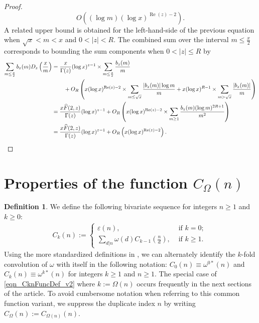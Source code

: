 \documentclass[11pt,reqno,a4letter]{article}
\numberwithin{equation}{section}
\numberwithin{figure}{section}
\numberwithin{table}{section}
\theoremstyle{plain}
\numberwithin{theorem}{section}
\theoremstyle{definition}
\newtheorem{definition}[theorem]{Definition}
\renewcommand{\Re}{\operatorname{Re}}
\begin{document}
\begin{proof}
\[     O\left((\log m) (\log x)^{\Re(z) - 2}\right). 
\]
A related upper bound is obtained for the left-hand-side of the previous equation when 
$\sqrt{x} < m < x$ and $0 < |z| < R$. 
The combined sum over the interval $m \leq \frac{x}{2}$ corresponds to bounding the 
sum components when $0 < |z| \leq R$ by 
\begin{align*} 
\sum_{m \leq \frac{x}{2}} b_z(m) D_z\left(\frac{x}{m}\right) & = \frac{x}{\Gamma(z)} (\log x)^{z-1} \times 
     \sum_{m \leq \frac{x}{2}} \frac{b_z(m)}{m} \\ 
     & \phantom{=\quad\ } + 
     O_R\left(x (\log x)^{\Re(z)-2} \times \sum_{m \leq \sqrt{x}} \frac{|b_z(m)| \log m}{m} + 
     x (\log x)^{R-1} \times \sum_{m > \sqrt{x}} \frac{|b_z(m)|}{m}\right) \\ 
     & = \frac{x \widehat{F}(2, z)}{\Gamma(z)} (\log x)^{z-1} + O_R\left( 
     x (\log x)^{\Re(z)-2} \times \sum_{m \geq 1} \frac{b_z(m) (\log m)^{2R+1}}{m^2} 
     \right) \\ 
     & = \frac{x \widehat{F}(2, z)}{\Gamma(z)} (\log x)^{z-1} + O_{R}\left( 
     x (\log x)^{\Re(z)-2}\right). 
     \qedhere  
\end{align*} 
\end{proof} 

\section{Properties of the function $C_{\Omega}(n)$} 
\label{Section_NewFormulasForgInvn_v1} 

\begin{definition}
We define the following bivariate sequence for integers $n \geq 1$ and $k \geq 0$: 
\begin{align} 
\label{eqn_CknFuncDef_v2} 
C_k(n) := \begin{cases} 
     \varepsilon(n), & \text{ if $k = 0$; } \\ 
     \sum\limits_{d|n} \omega(d) C_{k-1}\left(\frac{n}{d}\right), & \text{ if $k \geq 1$. } 
     \end{cases} 
\end{align} 
Using the more standardized definitions in \cite[\S 2]{ANT-BATEMAN-DIAMOND}, we can alternately 
identify the $k$-fold convolution of $\omega$ with itself in the following notation: 
$C_0(n) \equiv \omega^{0\ast}(n)$ and $C_k(n) \equiv \omega^{k\ast}(n)$ for 
integers $k \geq 1$ and $n \geq 1$. 
The special case of \eqref{eqn_CknFuncDef_v2} where 
$k := \Omega(n)$ occurs frequently in the next sections of the 
article. To avoid cumbersome notation when referring to this common function variant, we suppress the 
duplicate index $n$ by writing $C_{\Omega}(n) := C_{\Omega(n)}(n)$. 
\end{definition}
\end{document}
